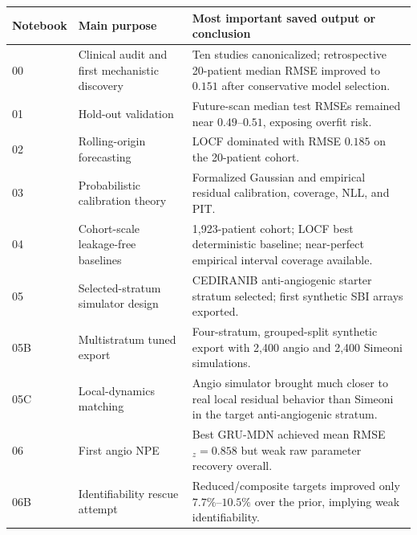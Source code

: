 \documentclass[11pt,a4paper]{article}
\begin{document}
\begin{center}
\small
\begin{tabular}{p{}p{}p{}}
\toprule
Notebook & Main purpose & Most important saved output or conclusion \\
\midrule
00 & Clinical audit and first mechanistic discovery & Ten studies canonicalized; retrospective 20-patient median RMSE improved to $0.151$ after conservative model selection. \\
01 & Hold-out validation & Future-scan median test RMSEs remained near $0.49$--$0.51$, exposing overfit risk. \\
02 & Rolling-origin forecasting & LOCF dominated with RMSE $0.185$ on the 20-patient cohort. \\
03 & Probabilistic calibration theory & Formalized Gaussian and empirical residual calibration, coverage, NLL, and PIT. \\
04 & Cohort-scale leakage-free baselines & 1,923-patient cohort; LOCF best deterministic baseline; near-perfect empirical interval coverage available. \\
05 & Selected-stratum simulator design & CEDIRANIB anti-angiogenic starter stratum selected; first synthetic SBI arrays exported. \\
05B & Multistratum tuned export & Four-stratum, grouped-split synthetic export with 2,400 angio and 2,400 Simeoni simulations. \\
05C & Local-dynamics matching & Angio simulator brought much closer to real local residual behavior than Simeoni in the target anti-angiogenic stratum. \\
06 & First angio NPE & Best GRU-MDN achieved mean RMSE$_z=0.858$ but weak raw parameter recovery overall. \\
06B & Identifiability rescue attempt & Reduced/composite targets improved only $7.7\%$--$10.5\%$ over the prior, implying weak identifiability. \\
\bottomrule
\end{tabular}
\end{center}
\end{document}
